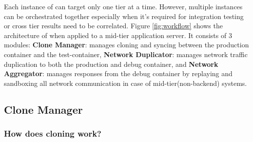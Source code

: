 Each instance of \parikshan can target only one tier at a time.
However, multiple instances can be orchestrated together especially when it's required for integration testing or cross tier results need to be correlated.
Figure \ref{fig:workflow} shows the architecture of \parikshan when applied to a mid-tier application server.
It consists of 3 modules: 
\textbf{Clone Manager}: manages cloning and syncing between the production container and the test-container, 
\textbf{Network Duplicator}: manages network traffic duplication  to both the production and debug container, 
and \textbf{Network Aggregator}: manages responses from the debug container by replaying and sandboxing all network communication in case of mid-tier(non-backend) systems.


\subsection{Clone Manager} 
\label{sec:CloneManager}

\subsubsection{How does cloning work?}
\label{sec:cloning}


